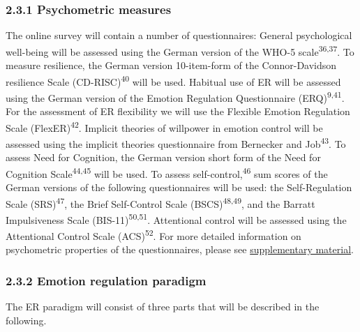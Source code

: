 \documentclass[
  english,
  man,floatsintext]{apa6}
\begin{document}
\hypertarget{psychometric-measures}{%
\subsubsection{2.3.1 Psychometric measures}\label{psychometric-measures}}

The online survey will contain a number of questionnaires: General psychological well-being will be assessed using the German version of the WHO-5 scale\textsuperscript{36,37}.
To measure resilience, the German version 10-item-form of the Connor-Davidson resilience Scale (CD-RISC)\textsuperscript{40} will be used.
Habitual use of ER will be assessed using the German version of the Emotion Regulation Questionnaire (ERQ)\textsuperscript{9,41}.
For the assessment of ER flexibility we will use the Flexible Emotion Regulation Scale (FlexER)\textsuperscript{42}.
Implicit theories of willpower in emotion control will be assessed using the implicit theories questionnaire from Bernecker and Job\textsuperscript{43}.
To assess Need for Cognition, the German version short form of the Need for Cognition Scale\textsuperscript{44,45} will be used.
To assess self-control,\textsuperscript{46} sum scores of the German versions of the following questionnaires will be used: the Self-Regulation Scale (SRS)\textsuperscript{47}, the Brief Self-Control Scale (BSCS)\textsuperscript{48,49}, and the Barratt Impulsiveness Scale (BIS-11)\textsuperscript{50,51}.
Attentional control will be assessed using the Attentional Control Scale (ACS)\textsuperscript{52}.
For more detailed information on psychometric properties of the questionnaires, please see \protect\hyperlink{SupplementQuestionnaires}{supplementary material}.

\hypertarget{emotion-regulation-paradigm}{%
\subsubsection{2.3.2 Emotion regulation paradigm}\label{emotion-regulation-paradigm}}

The ER paradigm will consist of three parts that will be described in the following.
\end{document}

